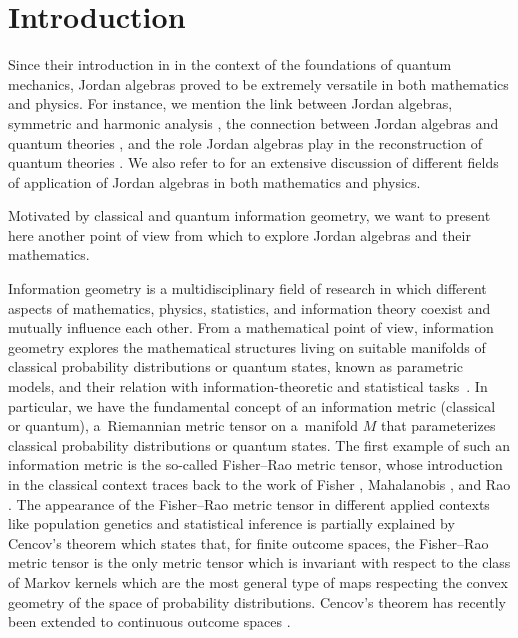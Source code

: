 \documentclass[pdftex]{sigma}
\numberwithin{equation}{section}
\begin{document}
\section{Introduction}\label{sec: introduction}

Since their introduction in \cite{J-vN-W-1934} in the context of the foundations of quantum mechanics, Jordan algebras proved to be extremely versatile in both mathematics and physics.
For instance, we mention the link between Jordan algebras, symmetric and harmonic analysis \cite{Chu-2012,Chu-2017,F-K-1994,Koecher-1999,Upmeier-1985}, the connection between Jordan algebras and quantum theories \cite{Baez-2022,F-F-M-P-2014,F-F-I-M-2013}, and the role Jordan algebras play in the reconstruction of quantum theories \cite{Niestegge-2020,W-vdW-2022}.
We also refer to \cite{Iordanescu-2011} for an extensive discussion of different fields of application of Jordan algebras in both mathematics and physics.

Motivated by classical and quantum information geometry, we want to present here another point of view from which to explore Jordan algebras and their mathematics.

Information geometry is a multidisciplinary field of research in which different aspects of mathematics, physics, statistics, and information theory coexist and mutually influence each other.
From a mathematical point of view, information geometry explores the mathematical structures living on suitable manifolds of classical probability distributions or quantum states, known as parametric models, and their relation with information-theoretic and statistical tasks~\cite{Amari-2016,A-N-2000}.
In particular, we have the fundamental concept of an information metric (classical or quantum), a~Riemannian metric tensor on a~manifold $M$ that parameterizes classical probability distributions or quantum states.
The first example of such an information metric is the so-called Fisher--Rao metric tensor, whose introduction in the classical context traces back to the work of Fisher \cite{Fisher-1922}, Mahalanobis \cite{Mahalanobis-1936}, and Rao \cite{Rao-1945}.
The appearance of the Fisher--Rao metric tensor in different applied contexts like population genetics and statistical inference is partially explained by Cencov's theorem \cite{Cencov-1982} which states that, for finite outcome spaces, the Fisher--Rao metric tensor is the only metric tensor which is invariant with respect to the class of Markov kernels which are the most general type of maps respecting the convex geometry of the space of probability distributions.
Cencov's theorem has recently been extended to continuous outcome spaces \cite{A-J-L-S-2015,A-J-L-S-2017,B-B-M-2016,Fujiwara-2023}.
\end{document}
